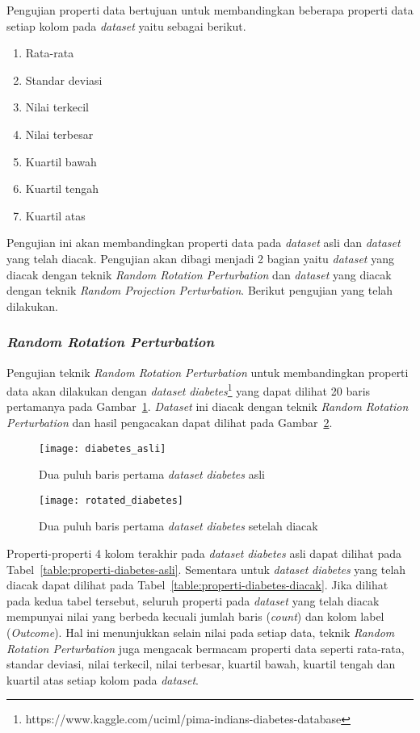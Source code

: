 Pengujian properti data bertujuan untuk membandingkan beberapa properti data setiap kolom pada \textit{dataset} yaitu sebagai berikut.
\begin{enumerate}
	\item Rata-rata
	\item Standar deviasi
	\item Nilai terkecil
	\item Nilai terbesar
	\item Kuartil bawah
	\item Kuartil tengah
	\item Kuartil atas
\end{enumerate}
Pengujian ini akan membandingkan properti data pada \textit{dataset} asli dan \textit{dataset} yang telah diacak. Pengujian akan dibagi menjadi 2 bagian yaitu \textit{dataset} yang diacak dengan teknik \textit{Random Rotation Perturbation} dan \textit{dataset} yang diacak dengan teknik \textit{Random Projection Perturbation}. Berikut pengujian yang telah dilakukan.

\subsubsection{\textit{Random Rotation Perturbation}}
\label{subsubsec:pengujian-properti-rrp}

Pengujian teknik \textit{Random Rotation Perturbation} untuk membandingkan properti data akan dilakukan dengan \textit{dataset} \textit{diabetes}\footnote{https://www.kaggle.com/uciml/pima-indians-diabetes-database} yang dapat dilihat 20 baris pertamanya pada Gambar~\ref{fig:diabetes_asli}. \textit{Dataset} ini diacak dengan teknik \textit{Random Rotation Perturbation} dan hasil pengacakan dapat dilihat pada Gambar~\ref{fig:rotated_diabetes}.

\begin{figure}
	\centering
	\texttt{[image: diabetes\_asli]}
	\caption{Dua puluh baris pertama \textit{dataset} \textit{diabetes} asli}
	\label{fig:diabetes_asli}
\end{figure}

\begin{figure}
	\centering
	\texttt{[image: rotated\_diabetes]}
	\caption{Dua puluh baris pertama \textit{dataset} \textit{diabetes} setelah diacak}
	\label{fig:rotated_diabetes}
\end{figure}

Properti-properti 4 kolom terakhir pada \textit{dataset} \textit{diabetes} asli dapat dilihat pada Tabel~\ref{table:properti-diabetes-asli}. Sementara untuk \textit{dataset} \textit{diabetes} yang telah diacak dapat dilihat pada Tabel~\ref{table:properti-diabetes-diacak}. Jika dilihat pada kedua tabel tersebut, seluruh properti pada \textit{dataset} yang telah diacak mempunyai nilai yang berbeda kecuali jumlah baris (\textit{count}) dan kolom label (\textit{Outcome}). Hal ini menunjukkan selain nilai pada setiap data, teknik \textit{Random Rotation Perturbation} juga mengacak bermacam properti data seperti rata-rata, standar deviasi, nilai terkecil, nilai terbesar, kuartil bawah, kuartil tengah dan kuartil atas setiap kolom pada \textit{dataset}.
	
